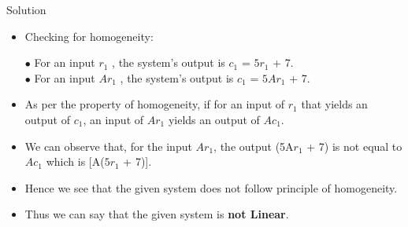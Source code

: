 \documentclass{beamer}
\begin{document}
\begin{frame}{Solution}
\begin{itemize}
   \item {Checking for homogeneity:}
    \begin{itemize}
        \subitem $\bullet$ {For an input \(r_1\) , the system's output is \(c_1\) = \(5r_1\) + 7.}\\
        \subitem $\bullet$ {For an input \(Ar_1\) , the system's output is \(c_1\) = \(5Ar_1\) + 7.}\\
    \end{itemize}
    \item As per the property of homogeneity, if for an input of \(r_1\) that yields an output of \(c_1\), an input of \(Ar_1\) yields an output of \(Ac_1\).\\
    
    \item We can observe that, for the input \(Ar_1\), the output (5A\(r_1\) + 7) is not equal to \(Ac_1\) which is  [A(\(5r_1\) + 7)].
    \item Hence we see that the given system does not follow principle of homogeneity.\\
    \item Thus we can say that the given system is \textbf{not Linear}.
\end{itemize}
\end{frame}
\end{document}
